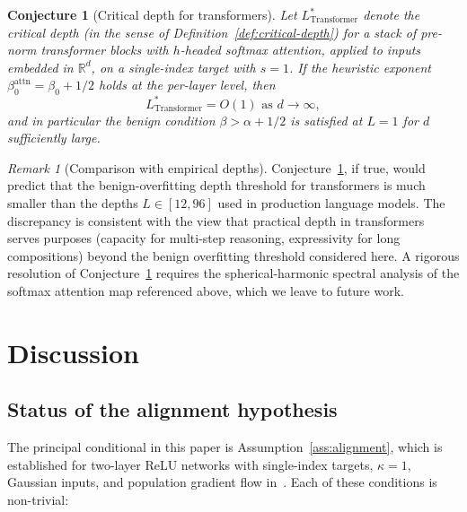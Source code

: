 \documentclass[12pt]{amsart}
\newtheorem{conjecture}[theorem]{Conjecture}
\theoremstyle{definition}
\theoremstyle{remark}
\newtheorem{remark}[theorem]{Remark}
\newcommand{\R}{\mathbb{R}}
\begin{document}
\begin{conjecture}[Critical depth for
transformers]\label{conj:transformer}
Let $L^{*}_{\mathrm{Transformer}}$ denote the critical depth (in the sense
of Definition~\ref{def:critical-depth}) for a stack of pre-norm
transformer blocks with $h$-headed softmax attention, applied to inputs
embedded in $\R^{d}$, on a single-index target with $s = 1$. If the
heuristic exponent $\beta_{0}^{\mathrm{attn}} = \beta_{0} + 1/2$ holds at
the per-layer level, then
\[
  L^{*}_{\mathrm{Transformer}} = O(1) \text{ as } d \to \infty,
\]
and in particular the benign condition $\beta > \alpha + 1/2$ is
satisfied at $L = 1$ for $d$ sufficiently large.
\end{conjecture}

\begin{remark}[Comparison with empirical depths]\label{rem:transformer-empirical}
Conjecture~\ref{conj:transformer}, if true, would predict that the
benign-overfitting depth threshold for transformers is much smaller than
the depths $L \in [12, 96]$ used in production language models. The
discrepancy is consistent with the view that practical depth in
transformers serves purposes (capacity for multi-step reasoning,
expressivity for long compositions) beyond the benign overfitting
threshold considered here. A rigorous resolution of
Conjecture~\ref{conj:transformer} requires the spherical-harmonic spectral
analysis of the softmax attention map referenced above, which we leave to
future work.
\end{remark}

\section{Discussion}\label{sec:discussion}

\subsection{Status of the alignment hypothesis}

The principal conditional in this paper is Assumption~\ref{ass:alignment},
which is established for two-layer ReLU networks with single-index
targets, $\kappa = 1$, Gaussian inputs, and population gradient flow
in~\cite{paperB}. Each of these conditions is non-trivial:
\end{document}
